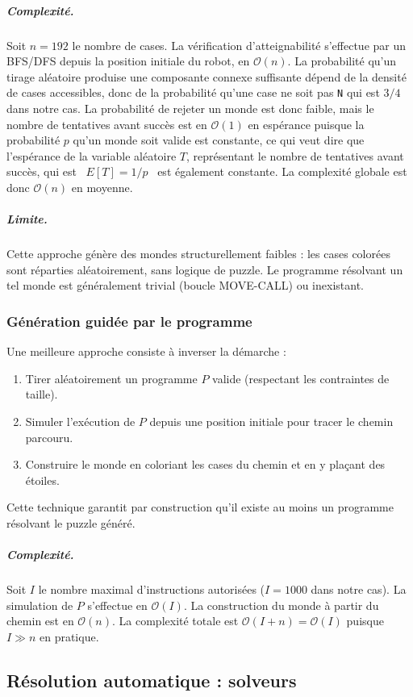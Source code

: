 \subparagraph{Complexité.}
Soit $n = 192$ le nombre de cases. La vérification d'atteignabilité s'effectue par un BFS/DFS depuis la position initiale du robot, en $\mathcal{O}(n)$. La probabilité qu'un tirage aléatoire produise une composante connexe suffisante dépend de la densité de cases accessibles, donc de la probabilité qu'une case ne soit pas \texttt{N} qui est ${3/4}$ dans notre cas. La probabilité de rejeter un monde est donc faible, mais le nombre de tentatives avant succès est en $\mathcal{O}(1)$ en espérance puisque la probabilité $p$ qu'un monde soit valide est constante, ce qui veut dire que l'espérance de la variable aléatoire $T$, représentant le nombre de tentatives avant succès, qui est ~$E[T]=1/p$~ est également constante. La complexité globale est donc $\mathcal{O}(n)$ en moyenne.

\subparagraph{Limite.}
Cette approche génère des mondes structurellement faibles : les cases colorées sont réparties aléatoirement, sans logique de puzzle. Le programme résolvant un tel monde est généralement trivial (boucle MOVE-CALL) ou inexistant.

\subsubsection*{Génération guidée par le programme}

Une meilleure approche consiste à inverser la démarche :
\begin{enumerate}
  \item Tirer aléatoirement un programme $P$ valide (respectant les contraintes de taille).
  \item Simuler l'exécution de $P$ depuis une position initiale pour tracer le chemin parcouru.
  \item Construire le monde en coloriant les cases du chemin et en y plaçant des étoiles.
\end{enumerate}

Cette technique garantit par construction qu'il existe au moins un programme résolvant le puzzle généré.

\subparagraph{Complexité.}
Soit $I$ le nombre maximal d'instructions autorisées ($I = 1000$ dans notre cas). La simulation de $P$ s'effectue en $\mathcal{O}(I)$. La construction du monde à partir du chemin est en $\mathcal{O}(n)$. La complexité totale est $\mathcal{O}(I + n) = \mathcal{O}(I)$ puisque $I \gg n$ en pratique.

\subsection{Résolution automatique : solveurs}

